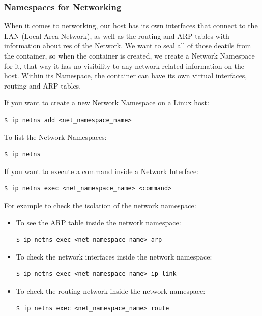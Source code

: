 \documentclass{article}
\newenvironment{codetemplate}[1][]{%
  \mybasecolorbox[#1]
  \itshape
}{%
  \endmybasecolorbox
}
\begin{document}
\subsubsection{Namespaces for Networking}

When it comes to networking, our host has its own interfaces that connect to the LAN (Local Area Network), as well as the routing and ARP tables with information about res of the Network. We want to seal all of those deatils from the container, so when the container is created, we create a Network Namespace for it, that way it has no visibility to any network-related information on the host. Within its Namespace, the container can have its own virtual interfaces, routing and ARP tables.

If you want to create a new Network Namespace on a Linux host:
\begin{codetemplate}{}
\begin{verbatim}
$ ip netns add <net_namespace_name>
\end{verbatim}
\end{codetemplate}

To list the Network Namespaces:
\begin{codetemplate}{}
\begin{verbatim}
$ ip netns
\end{verbatim}
\end{codetemplate}

If you want to execute a command inside a Network Interface:
\begin{codetemplate}{}
\begin{verbatim}
$ ip netns exec <net_namespace_name> <command>
\end{verbatim}
\end{codetemplate}

For example to check the isolation of the network namespace:
\begin{itemize}
    \item To see the ARP table inside the network namespace:
\begin{codetemplate}{}
\begin{verbatim}
$ ip netns exec <net_namespace_name> arp
\end{verbatim}
\end{codetemplate}
    \item To check the network interfaces inside the network namespace:
\begin{codetemplate}{}
\begin{verbatim}
$ ip netns exec <net_namespace_name> ip link
\end{verbatim}
\end{codetemplate}
    \item To check the routing network inside the network namespace:
\begin{codetemplate}{}
\begin{verbatim}
$ ip netns exec <net_namespace_name> route
\end{verbatim}
\end{codetemplate}
\end{itemize}
\end{document}
